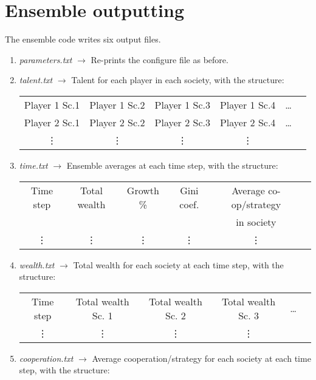 \documentclass{article}
\begin{document}
\section{Ensemble outputting}
The ensemble code writes six output files. 
\begin{enumerate}
\item \emph{parameters.txt} $\rightarrow$ Re-prints the configure file as before. 

\item \emph{talent.txt} $\rightarrow$ Talent for each player in each society, with the structure:

\begin{center}
\begin{tabular}{c c c c c c}
Player 1 Sc.1 & Player 1 Sc.2 & Player 1 Sc.3 & Player 1 Sc.4 & \dots \\ 
Player 2 Sc.1 & Player 2 Sc.2 & Player 2 Sc.3 & Player 2 Sc.4 & \dots \\
\vdots & \vdots &  \vdots &  \vdots &   
\end{tabular} 
\end{center}


\item \emph{time.txt} $\rightarrow$ Ensemble averages at each time step, with the structure:

\begin{center}
\begin{tabular}{c c c c c c}
Time step & Total wealth & Growth \% & Gini coef. & Average co-op/strategy \\ 
 & & & & in society \\
 \vdots & \vdots &  \vdots &  \vdots & \vdots
\end{tabular} 
\end{center}

\item \emph{wealth.txt} $\rightarrow$ Total wealth for each society at each time step, with the structure:

\begin{center}
\begin{tabular}{c c c c c c}
Time step & Total wealth Sc. 1 & Total wealth Sc. 2 & Total wealth Sc. 3 & \dots \\
\vdots & \vdots &  \vdots &  \vdots &
\end{tabular} 
\end{center}

\item \emph{cooperation.txt} $\rightarrow$ Average cooperation/strategy for each society at each time step, with the structure:


\end{enumerate}
\end{document}
